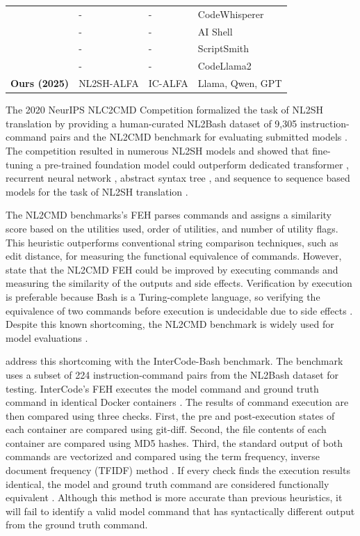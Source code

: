 \documentclass[11pt]{article}
\begin{document}
\begin{table}[ht!]
\begin{tabular}{llll}
    \citet{cwai}            & -                 & -             & CodeWhisperer    \\
    \citet{msai}            & -                 & -             & AI Shell         \\
    \citet{scriptsmith}     & -                 & -             & ScriptSmith      \\
    \citet{bash-assistant}  & -                 & -             & CodeLlama2       \\ \hline
    \textbf{Ours (2025)}    & NL2SH-ALFA        & IC-ALFA       & Llama, Qwen, GPT \\ \hline
  \end{tabular}
  \label{tab:related}
\end{table}

The 2020 NeurIPS NLC2CMD Competition formalized the task of NL2SH translation by providing a human-curated NL2Bash dataset of 9,305 instruction-command pairs and the NL2CMD benchmark for evaluating submitted models \cite{NL2Bash, NL2CMD-Comp}. The competition resulted in numerous NL2SH models and showed that fine-tuning a pre-trained foundation model could outperform dedicated transformer \cite{Magnum}, recurrent neural network \cite{Tellina}, abstract syntax tree \cite{AST}, and sequence to sequence \cite{AInix} based models for the task of NL2SH translation \cite{ShellGPT}.

The NL2CMD benchmarks's FEH parses commands and assigns a similarity score based on the utilities used, order of utilities, and number of utility flags. This heuristic outperforms conventional string comparison techniques, such as edit distance, for measuring the functional equivalence of commands. However, \citet{NL2CMD-Comp} state that the NL2CMD FEH could be improved by executing commands and measuring the similarity of the outputs and side effects. Verification by execution is preferable because Bash is a Turing-complete language, so verifying the equivalence of two commands before execution is undecidable due to side effects \cite{undecided}. Despite this known shortcoming, the NL2CMD benchmark is widely used for model evaluations \cite{NL2CMD}.

\citet{InterCode} address this shortcoming with the InterCode-Bash benchmark. The benchmark uses a subset of 224 instruction-command pairs from the NL2Bash dataset for testing. InterCode's FEH executes the model command and ground truth command in identical Docker containers \cite{docker}. The results of command execution are then compared using three checks. First, the pre and post-execution states of each container are compared using git-diff. Second, the file contents of each container are compared using MD5 hashes. Third, the standard output of both commands are vectorized and compared using the term frequency, inverse document frequency (TFIDF) method \cite{tfidf}. If every check finds the execution results identical, the model and ground truth command are considered functionally equivalent \cite{InterCode}. Although this method is more accurate than previous heuristics, it will fail to identify a valid model command that has syntactically different output from the ground truth command.
\end{document}
